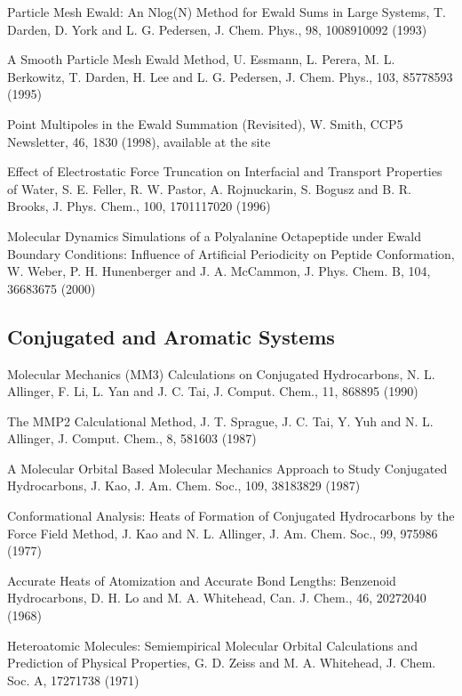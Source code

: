 \documentclass[letterpaper,11pt,english]{sphinxmanual}
\begin{document}
Particle Mesh Ewald: An Nlog(N) Method for Ewald Sums in Large Systems, T. Darden, D. York and L. G. Pedersen, J. Chem. Phys., 98, 10089\sphinxhyphen{}10092 (1993)

A Smooth Particle Mesh Ewald Method, U. Essmann, L. Perera, M. L. Berkowitz, T. Darden, H. Lee and L. G. Pedersen, J. Chem. Phys., 103, 8577\sphinxhyphen{}8593 (1995)

Point Multipoles in the Ewald Summation (Revisited), W. Smith, CCP5 Newsletter, 46, 18\sphinxhyphen{}30 (1998), available at the site 

Effect of Electrostatic Force Truncation on Interfacial and Transport Properties of Water, S. E. Feller, R. W. Pastor, A. Rojnuckarin, S. Bogusz and B. R. Brooks, J. Phys. Chem., 100, 17011\sphinxhyphen{}17020 (1996)

Molecular Dynamics Simulations of a Polyalanine Octapeptide under Ewald Boundary Conditions: Influence of Artificial Periodicity on Peptide Conformation, W. Weber, P. H. Hunenberger and J. A. McCammon, J. Phys. Chem. B, 104, 3668\sphinxhyphen{}3675 (2000)


\subsection{Conjugated and Aromatic Systems}
\label{\detokenize{text/references:conjugated-and-aromatic-systems}}
Molecular Mechanics (MM3) Calculations on Conjugated Hydrocarbons, N. L. Allinger, F. Li, L. Yan and J. C. Tai, J. Comput. Chem., 11, 868\sphinxhyphen{}895 (1990)

The MMP2 Calculational Method, J. T. Sprague, J. C. Tai, Y. Yuh and N. L. Allinger, J. Comput. Chem., 8, 581\sphinxhyphen{}603 (1987)

A Molecular Orbital Based Molecular Mechanics Approach to Study Conjugated Hydrocarbons, J. Kao, J. Am. Chem. Soc., 109, 3818\sphinxhyphen{}3829 (1987)

Conformational Analysis: Heats of Formation of Conjugated Hydrocarbons by the Force Field Method, J. Kao and N. L. Allinger, J. Am. Chem. Soc., 99, 975\sphinxhyphen{}986 (1977)

Accurate Heats of Atomization and Accurate Bond Lengths: Benzenoid Hydrocarbons, D. H. Lo and M. A. Whitehead, Can. J. Chem., 46, 2027\sphinxhyphen{}2040 (1968)

Hetero\sphinxhyphen{}atomic Molecules: Semi\sphinxhyphen{}empirical Molecular Orbital Calculations and Prediction of Physical Properties, G. D. Zeiss and M. A. Whitehead, J. Chem. Soc. A, 1727\sphinxhyphen{}1738 (1971)
\end{document}
